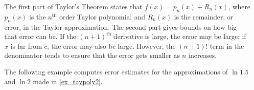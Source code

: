 The first part of Taylor's Theorem states that $f(x) = p_n(x) + R_n(x)$, where $p_n(x)$ is the $n^\text{th}$ order Taylor polynomial and $R_n(x)$ is the remainder, or error, in the Taylor approximation. The second part gives bounds on how big that error can be. If the $(n+1)^\text{th}$ derivative is large, the error may be large; if $x$ is far from $c$, the error may also be large. However, the $(n+1)!$ term in the denominator tends to ensure that the error gets smaller as $n$ increases.

The following example computes error estimates for the approximations of $\ln 1.5$ and $\ln 2$ made in \autoref{ex_taypoly2}.

